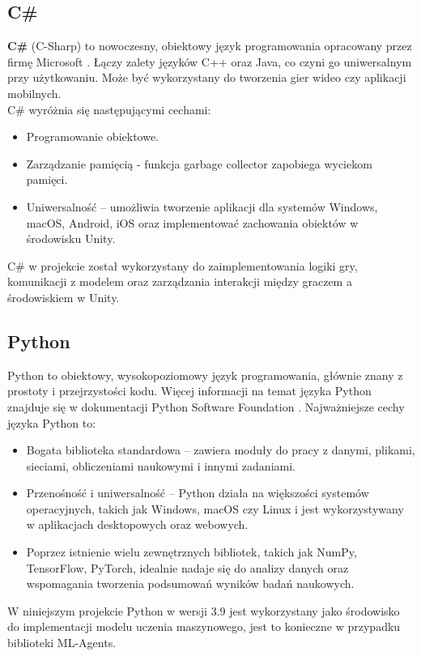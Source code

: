 \documentclass[a4paper,twoside,12pt]{book}
\begin{document}
	\subsection{C\#}
	\textbf{C\#} (C-Sharp) to nowoczesny, obiektowy język programowania opracowany przez firmę Microsoft \cite{bib:csharp_doc}. Łączy zalety języków C++ oraz Java, co czyni go uniwersalnym przy użytkowaniu. Może być wykorzystany do tworzenia gier wideo czy aplikacji mobilnych.
	\\C\# wyróżnia się następującymi cechami:
	\begin{itemize}
		\item Programowanie obiektowe.
		\item Zarządzanie pamięcią - funkcja garbage collector zapobiega wyciekom pamięci.
		 \item Uniwersalność – umożliwia tworzenie aplikacji dla systemów Windows, macOS, Android, iOS oraz implementować zachowania obiektów w środowisku Unity.
	\end{itemize}
	 C\# w projekcie został wykorzystany do zaimplementowania logiki gry, komunikacji z modelem oraz zarządzania interakcji między graczem a środowiskiem w Unity.
	\subsection{Python}
	Python to obiektowy, wysokopoziomowy język programowania, głównie znany z prostoty i przejrzystości kodu. Więcej informacji na temat języka Python znajduje się w dokumentacji Python Software Foundation \cite{bib:pythonblurb}.
	Najważniejsze cechy języka Python to:
	\begin{itemize}
		\item Bogata biblioteka standardowa – zawiera moduły do pracy z danymi, plikami, sieciami, obliczeniami naukowymi i innymi zadaniami.
		\item Przenośność i uniwersalność – Python działa na większości systemów operacyjnych, takich jak Windows, macOS czy Linux i jest wykorzystywany w aplikacjach desktopowych oraz webowych.
		\item Poprzez istnienie wielu zewnętrznych bibliotek, takich jak NumPy, TensorFlow, PyTorch, idealnie nadaje się do analizy danych oraz wspomagania tworzenia podsumowań wyników badań naukowych.
	\end{itemize}
	W niniejszym projekcie Python w wersji 3.9 jest wykorzystany jako środowisko do implementacji modelu uczenia maszynowego, jest to konieczne w przypadku biblioteki ML-Agents.
\end{document}
